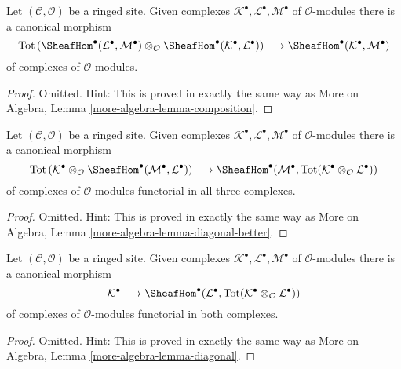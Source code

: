 \begin{lemma}
\label{lemma-composition}
Let $(\mathcal{C}, \mathcal{O})$ be a ringed site. Given complexes
$\mathcal{K}^\bullet, \mathcal{L}^\bullet, \mathcal{M}^\bullet$
of $\mathcal{O}$-modules there is a canonical morphism
$$
\text{Tot}\left(
\SheafHom^\bullet(\mathcal{L}^\bullet, \mathcal{M}^\bullet)
\otimes_\mathcal{O}
\SheafHom^\bullet(\mathcal{K}^\bullet, \mathcal{L}^\bullet)
\right)
\longrightarrow
\SheafHom^\bullet(\mathcal{K}^\bullet, \mathcal{M}^\bullet)
$$
of complexes of $\mathcal{O}$-modules.
\end{lemma}

\begin{proof}
Omitted. Hint: This is proved in exactly the same way as
More on Algebra, Lemma \ref{more-algebra-lemma-composition}.
\end{proof}

\begin{lemma}
\label{lemma-diagonal-better}
Let $(\mathcal{C}, \mathcal{O})$ be a ringed site. Given complexes
$\mathcal{K}^\bullet, \mathcal{L}^\bullet, \mathcal{M}^\bullet$
of $\mathcal{O}$-modules there is a canonical morphism
$$
\text{Tot}\left(
\mathcal{K}^\bullet \otimes_\mathcal{O}
\SheafHom^\bullet(\mathcal{M}^\bullet, \mathcal{L}^\bullet)
\right)
\longrightarrow
\SheafHom^\bullet(\mathcal{M}^\bullet,
\text{Tot}(\mathcal{K}^\bullet \otimes_\mathcal{O} \mathcal{L}^\bullet))
$$
of complexes of $\mathcal{O}$-modules functorial in all three complexes.
\end{lemma}

\begin{proof}
Omitted. Hint: This is proved in exactly the same way as
More on Algebra, Lemma \ref{more-algebra-lemma-diagonal-better}.
\end{proof}

\begin{lemma}
\label{lemma-diagonal}
Let $(\mathcal{C}, \mathcal{O})$ be a ringed site. Given complexes
$\mathcal{K}^\bullet, \mathcal{L}^\bullet, \mathcal{M}^\bullet$
of $\mathcal{O}$-modules there is a canonical morphism
$$
\mathcal{K}^\bullet
\longrightarrow
\SheafHom^\bullet(\mathcal{L}^\bullet,
\text{Tot}(\mathcal{K}^\bullet \otimes_\mathcal{O} \mathcal{L}^\bullet))
$$
of complexes of $\mathcal{O}$-modules functorial in both complexes.
\end{lemma}

\begin{proof}
Omitted. Hint: This is proved in exactly the same way as
More on Algebra, Lemma \ref{more-algebra-lemma-diagonal}.
\end{proof}

